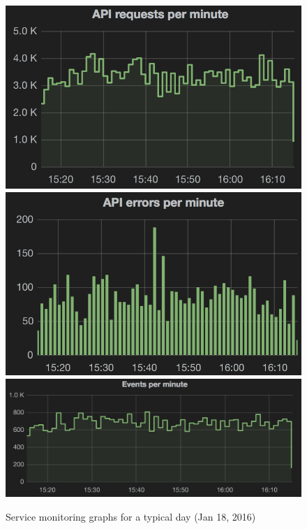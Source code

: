 \documentclass{sig-alternate}
\begin{document}
\begin{figure}
  \begin{center}
    \includegraphics[scale=0.332]{api-requests}
    \includegraphics[scale=0.332]{api-errors}
    \includegraphics[scale=0.438]{events-per-min}
  \end{center}
  \caption{Service monitoring graphs for a typical day (Jan 18,
  2016)}
  \label{fig:service-stats}
\end{figure}
\end{document}
